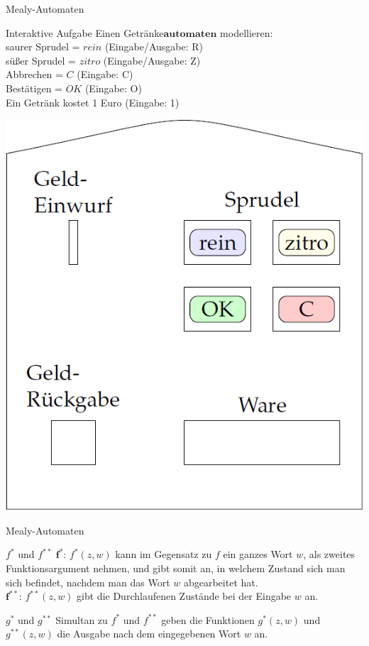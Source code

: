 	
	\begin{frame}{Mealy-Automaten}
		\begin{block}{Interaktive Aufgabe}
			Einen Getränke$\mathbf{automaten}$ modellieren:\\
			saurer Sprudel = $rein$ (Eingabe/Ausgabe: R)\\
			süßer Sprudel = $zitro$ (Eingabe/Ausgabe: Z)\\
			Abbrechen = $C$ (Eingabe: C)\\
			Bestätigen = $OK$ (Eingabe: O)\\
			Ein Getränk kostet 1 Euro (Eingabe: 1)
		\end{block}
		\begin{center}
		
		\includegraphics[scale=0.2]{graphics/10/getraenke.png}
		\end{center}
	\end{frame}
	
	
	\begin{frame}{Mealy-Automaten}
		\begin{block}{$f^*$ und $f^{**}$}
			$\mathbf{f^*}$: $f^*(z,w)$ kann im Gegensatz zu $f$ ein ganzes Wort $w$, als zweites Funktionsargument nehmen, und gibt somit an, in welchem Zustand sich man sich befindet, nachdem man das Wort $w$ abgearbeitet hat.\\
			\vspace{10pt}
			$\mathbf{f^{**}}$: $f^{**}(z,w)$ gibt die Durchlaufenen Zustände bei der Eingabe $w$ an.
		\end{block}
		
		\pause
		\begin{block}{$g^*$ und $g^{**}$}
			Simultan zu $f^*$ und $f^{**}$ geben die Funktionen $g^*(z,w)$ und $g^{**}(z,w)$ die Ausgabe nach dem eingegebenen Wort $w$ an.
		\end{block}
	\end{frame}
	
